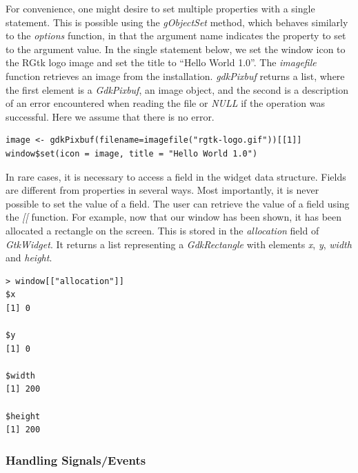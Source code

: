 \documentclass[article]{jss}
\begin{document}
For convenience, one might desire to set multiple properties with a
single statement.
This is possible using the \emph{gObjectSet} method, which behaves
similarly
to the  \emph{options} function, in that the argument name
indicates
the property to set to the argument value. 
In the single statement below, we 
set the window icon to the RGtk logo image and set the title to
``Hello World 1.0''. 
The \emph{imagefile} function retrieves an image from the 
installation.
\emph{gdkPixbuf} returns a list, where the first element is a
\emph{GdkPixbuf}, an image object,
and the second is a description of an error encountered when reading
the file
or \emph{NULL} if the operation was successful. Here we assume that
there is no error.
\begin{verbatim}
image <- gdkPixbuf(filename=imagefile("rgtk-logo.gif"))[[1]]
window$set(icon = image, title = "Hello World 1.0")
\end{verbatim}

In rare cases, it is necessary to access a field in the widget data
structure.
Fields are different from properties in several ways. Most
importantly, it is
never possible to set the value of a field. The user can retrieve the
value of
a field using the \emph{[[} function. For example, now that our window
has been shown, it has been allocated a rectangle on the screen. This
is stored
in the \emph{allocation} field of \emph{GtkWidget}. It returns a list 
representing a \emph{GdkRectangle} with
elements \emph{x}, \emph{y}, \emph{width} and \emph{height}.


\begin{verbatim}
> window[["allocation"]]
$x
[1] 0

$y
[1] 0

$width
[1] 200

$height
[1] 200
\end{verbatim}

\subsubsection{Handling Signals/Events}
\end{document}
